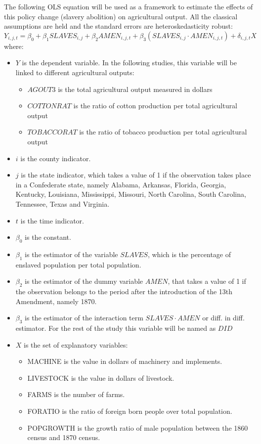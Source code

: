 \documentclass[12pt]{report}
\begin{document}
The following OLS equation will be used as a framework to estimate the effects of this policy change (slavery abolition) on agricultural output. All the classical assumptions are held and the standard errors are heteroskedasticity robust:
\begin{equation}
Y_{i,j,t}=\beta_{0}+\beta_{1}SLAVES_{i,j}+\beta_{2}AMEN_{i,j,t}+\beta_{3}(SLAVES_{i,j}\cdot AMEN_{i,j,t})+\delta_{i,j,t}X
\end{equation}
 where:
\begin{itemize}
\item $Y$ is the dependent variable. In the following studies, this variable will be linked to different agricultural outputs:
\begin{itemize}
\item $AGOUT3$ is the total agricultural output measured in dollars
\item $COTTONRAT$ is the ratio of cotton production per total agricultural output
\item $TOBACCORAT$ is the ratio of tobacco production per total agricultural output
\end{itemize}
\item $i$ is the county indicator.
\item $j$ is the state indicator, which takes a value of 1 if the observation takes place in a Confederate state, namely Alabama, Arkansas, Florida, Georgia, Kentucky, Louisiana, Mississippi, Missouri, North Carolina, South Carolina, Tennessee, Texas and Virginia.
\item $t$ is the time indicator.
\item $\beta_{0}$ is the constant.
\item $\beta_{1}$ is the estimator of the variable $SLAVES$, which is the percentage of enslaved population per total population.
\item $\beta_{2}$ is the estimator of the dummy variable $AMEN$, that takes a value of 1 if the observation belongs to the period after the introduction of the 13th Amendment, namely 1870.
\item $\beta_{3}$ is the estimator of the interaction term $SLAVES \cdot AMEN$ or diff. in diff. estimator. For the rest of the study this variable will be named as $DID$
\item $X$ is the set of explanatory variables:
\begin{itemize}
\item MACHINE is the value in dollars of machinery and implements.
\item LIVESTOCK is the value in dollars of livestock.
\item FARMS is the number of farms.
\item FORATIO is the ratio of foreign born people over total population.
\item POPGROWTH is the growth ratio of male population between the 1860 census and 1870 census.
\end{itemize}
\end{itemize}
\end{document}
